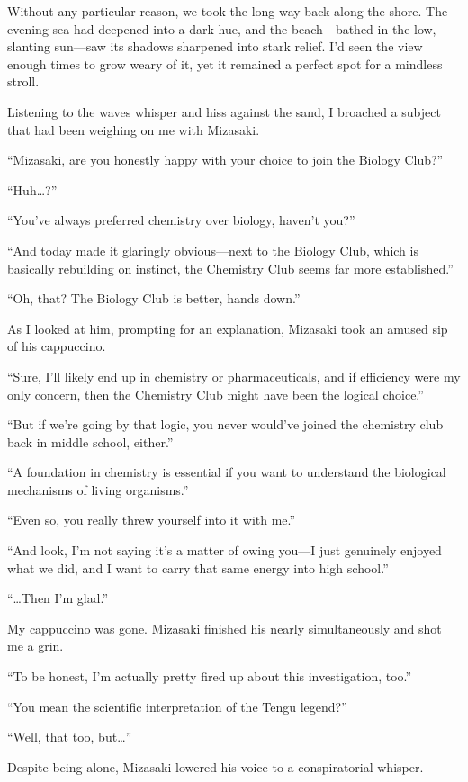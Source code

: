 \documentclass[
    a4paper,
    12pt,
    twoside,
    openany,
    UTF8,
    fontset=windows
]{ctexbook}
\begin{document}
Without any particular reason, we took the long way back along the shore. The evening sea had deepened into a dark hue, and the beach---bathed in the low, slanting sun---saw its shadows sharpened into stark relief. I'd seen the view enough times to grow weary of it, yet it remained a perfect spot for a mindless stroll.

Listening to the waves whisper and hiss against the sand, I broached a subject that had been weighing on me with Mizasaki.

``Mizasaki, are you honestly happy with your choice to join the Biology Club?''

``Huh\dots?''

``You've always preferred chemistry over biology, haven't you?''

``And today made it glaringly obvious---next to the Biology Club, which is basically rebuilding on instinct, the Chemistry Club seems far more established.''

``Oh, that? The Biology Club is better, hands down.''

As I looked at him, prompting for an explanation, Mizasaki took an amused sip of his cappuccino.

``Sure, I'll likely end up in chemistry or pharmaceuticals, and if efficiency were my only concern, then the Chemistry Club might have been the logical choice.''

``But if we're going by that logic, you never would've joined the chemistry club back in middle school, either.''

``A foundation in chemistry is essential if you want to understand the biological mechanisms of living organisms.''

``Even so, you really threw yourself into it with me.''

``And look, I'm not saying it's a matter of owing you---I just genuinely enjoyed what we did, and I want to carry that same energy into high school.''

``\dots Then I'm glad.''

My cappuccino was gone. Mizasaki finished his nearly simultaneously and shot me a grin.

``To be honest, I'm actually pretty fired up about this investigation, too.''

``You mean the scientific interpretation of the Tengu legend?''

``Well, that too, but\dots''

Despite being alone, Mizasaki lowered his voice to a conspiratorial whisper.
\end{document}
